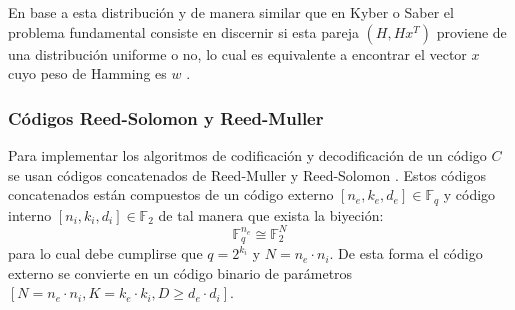 En base a esta distribución y de manera similar que en Kyber o Saber el problema fundamental consiste en discernir si esta pareja \((H, Hx^T)\) proviene  de una distribución uniforme o no, lo cual es equivalente a encontrar el vector \(x\) cuyo peso de Hamming es \(w\) \cite{hqc-spec-2022}.
\subsubsection{Códigos Reed-Solomon y Reed-Muller}
Para implementar los algoritmos de codificación y decodificación de un código \(C\) se usan códigos concatenados de Reed-Muller y Reed-Solomon \cite{hqc2025}. Estos códigos concatenados están compuestos de un código externo \([n_e, k_e, d_e]\in \mathbb{F}_q\) y código interno \([n_i,k_i,d_i]\in \mathbb{F}_2\) de tal manera que exista la biyeción:
\begin{equation}
	\mathbb{F}_q^{n_e} \cong \mathbb{F}^N_2
\end{equation}
para lo cual debe cumplirse que \(q=2^{k_i}\) y \(N=n_e\cdot n_i\). De esta forma el código externo se convierte en un código binario de parámetros \([N=n_e\cdot n_i,K=k_e\cdot k_i,D\ge d_e\cdot d_i]\).
\newline

